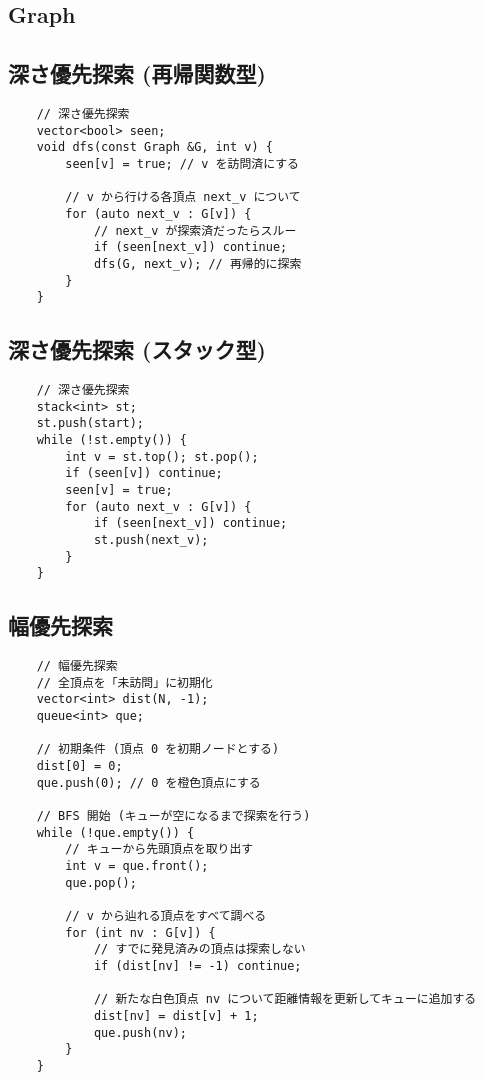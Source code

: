 \documentclass[a4paper, landscape, 9pt]{jarticle} %
\begin{document}
\begin{multicols*}{3}
    \section{Graph}

    \subsection{深さ優先探索 (再帰関数型)}
    \begin{lstlisting}
    // 深さ優先探索
    vector<bool> seen;
    void dfs(const Graph &G, int v) {
        seen[v] = true; // v を訪問済にする
    
        // v から行ける各頂点 next_v について
        for (auto next_v : G[v]) { 
            // next_v が探索済だったらスルー
            if (seen[next_v]) continue;
            dfs(G, next_v); // 再帰的に探索
        }
    }
    \end{lstlisting}

    \subsection{深さ優先探索 (スタック型)}
    \begin{lstlisting}
    // 深さ優先探索
    stack<int> st;
    st.push(start);
    while (!st.empty()) {
        int v = st.top(); st.pop();
        if (seen[v]) continue;
        seen[v] = true;
        for (auto next_v : G[v]) {
            if (seen[next_v]) continue;
            st.push(next_v);
        }
    }
    \end{lstlisting}

    \subsection{幅優先探索}
    \begin{lstlisting}
    // 幅優先探索
    // 全頂点を「未訪問」に初期化
    vector<int> dist(N, -1); 
    queue<int> que;

    // 初期条件 (頂点 0 を初期ノードとする)
    dist[0] = 0;
    que.push(0); // 0 を橙色頂点にする

    // BFS 開始 (キューが空になるまで探索を行う)
    while (!que.empty()) {
        // キューから先頭頂点を取り出す
        int v = que.front(); 
        que.pop();

        // v から辿れる頂点をすべて調べる
        for (int nv : G[v]) {
            // すでに発見済みの頂点は探索しない
            if (dist[nv] != -1) continue; 

            // 新たな白色頂点 nv について距離情報を更新してキューに追加する
            dist[nv] = dist[v] + 1;
            que.push(nv);
        }
    }
    \end{lstlisting}


\end{multicols*}
\end{document}
